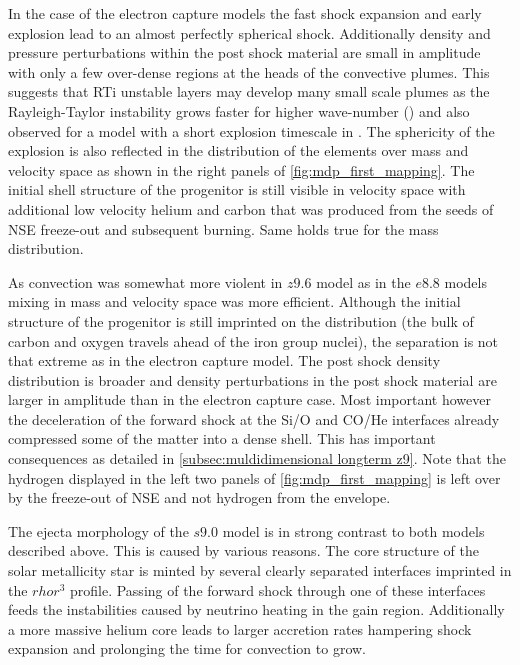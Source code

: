 \documentclass[fleqn,usenatbib]{mnras}
\begin{document}
In the case of the electron capture models the fast shock expansion and early explosion lead to an almost perfectly spherical shock. Additionally density and pressure perturbations within the post shock material are small in amplitude with only a few over-dense regions at the heads of the convective plumes. 
This suggests that RTi unstable layers may develop many small scale plumes as the Rayleigh-Taylor instability grows faster for higher wave-number (\cite{Guilet2009}) and also observed for a model with a short explosion timescale in \cite{Kifonidis2003}.
The sphericity of the explosion is also reflected in the distribution of the elements over mass and velocity space as shown in the right panels of \autoref{fig:mdp_first_mapping}. The initial shell structure of the progenitor is still visible in velocity space with additional low velocity helium and carbon that was produced from the seeds of NSE freeze-out and subsequent burning. Same holds true for the mass distribution. 

As convection was somewhat more violent in $z9.6$ model as in the $e8.8$ models mixing in mass and velocity space was more efficient. Although the initial structure of the progenitor is still imprinted on the distribution (the bulk of carbon and oxygen travels ahead of the iron group nuclei), the separation is not that extreme as in the electron capture model. The post shock density distribution is broader and density perturbations in the post shock material are larger in amplitude than in the electron capture case. Most important however the deceleration of the forward shock at the Si/O and CO/He interfaces already compressed some of the matter into a dense shell. This has important consequences as detailed in \autoref{subsec:muldidimensional longterm z9}.
Note that the hydrogen displayed in the left two panels of \autoref{fig:mdp_first_mapping} is left over by the freeze-out of NSE and not hydrogen from the envelope. 

The ejecta morphology of the  $s9.0$ model is in strong contrast to both models described above. This is caused by various reasons. 
The core structure of the solar metallicity star is minted by several clearly separated interfaces imprinted in the $rho r^3$ profile. Passing of the forward shock through one of these interfaces feeds the instabilities caused by neutrino heating in the gain region.
Additionally a more massive helium core leads to larger accretion rates hampering shock expansion and prolonging the time for convection to grow.
\end{document}
